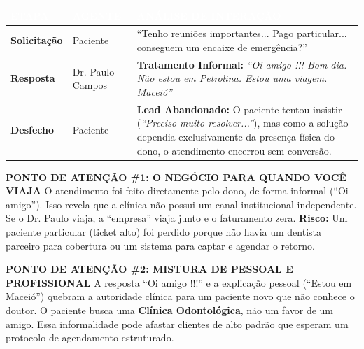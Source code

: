 \documentclass[a4paper,11pt]{article}
\begin{document}
\begin{tcolorbox}[enhanced, frame hidden, colback=white]
    \renewcommand{\arraystretch}{1.5}
    \begin{tabular}{ | p{} | p{} | p{} | }
        \hline
        \rowcolor{infoDentalTeal}
        \textbf{\textcolor{white}{ETAPA}} & \textbf{\textcolor{white}{AGENTE}} & \textbf{\textcolor{white}{ANÁLISE DE INTERAÇÃO}} \\
        \hline
        \textbf{Solicitação} & Paciente &
        \small ``Tenho reuniões importantes... Pago particular... conseguem um encaixe de emergência?'' \\
        \hline
        \textbf{Resposta} & Dr. Paulo Campos &
        \textbf{Tratamento Informal:} \newline
        \textit{``Oi amigo !!! Bom-dia. Não estou em Petrolina. Estou uma viagem. Maceió''} \\
        \hline
        \textbf{Desfecho} & Paciente &
        \textbf{Lead Abandonado:} O paciente tentou insistir (\textit{``Preciso muito resolver...''}), mas como a solução dependia exclusivamente da presença física do dono, o atendimento encerrou sem conversão. \\
        \hline
    \end{tabular}
\end{tcolorbox}

\begin{tcolorbox}[colback=infoDentalRed!5, colframe=infoDentalRed, boxrule=0.5pt, arc=0mm, left=2mm, right=2mm]
    \textbf{\textcolor{infoDentalRed}{PONTO DE ATENÇÃO \#1: O NEGÓCIO PARA QUANDO VOCÊ VIAJA}}
    \footnotesize
    O atendimento foi feito diretamente pelo dono, de forma informal (``Oi amigo'').
    Isso revela que a clínica não possui um canal institucional independente. Se o Dr. Paulo viaja, a ``empresa'' viaja junto e o faturamento zera.
    \textbf{Risco:} Um paciente particular (ticket alto) foi perdido porque não havia um dentista parceiro para cobertura ou um sistema para captar e agendar o retorno.
\end{tcolorbox}
\vspace{0.2cm}

\begin{tcolorbox}[colback=infoDentalGray, colframe=infoDentalTeal, boxrule=0.5pt, arc=0mm, left=2mm, right=2mm]
    \textbf{\textcolor{infoDentalTeal}{PONTO DE ATENÇÃO \#2: MISTURA DE PESSOAL E PROFISSIONAL}}
    \footnotesize
    A resposta ``Oi amigo !!!'' e a explicação pessoal (``Estou em Maceió'') quebram a autoridade clínica para um paciente novo que não conhece o doutor.
    O paciente busca uma \textbf{Clínica Odontológica}, não um favor de um amigo. Essa informalidade pode afastar clientes de alto padrão que esperam um protocolo de agendamento estruturado.
\end{tcolorbox}
\end{document}
